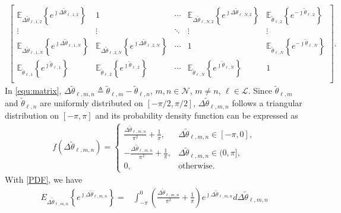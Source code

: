 \documentclass[12pt,draftclsnofoot, onecolumn]{IEEEtran}
\theoremstyle{plain}
\begin{document}
\begin{sloppypar}
\begin{align}
\begin{bmatrix}
\mathbb E_{\Delta\tilde{\theta}_{\ell,1,2}}\left\lbrace e^{\jmath\Delta\tilde{\theta}_{\ell,1,2}}\right\rbrace & 1 & \cdots & \mathbb E_{\Delta\tilde{\theta}_{\ell,N,2}}\left\lbrace e^{\jmath\Delta\tilde{\theta}_{\ell,N,2}}\right\rbrace & \mathbb E_{\tilde\theta_{\ell,2}}\left\lbrace e^{-\jmath\tilde{\theta}_{\ell,2}}\right\rbrace \\
\vdots & \vdots & \ddots & \vdots & \vdots \\
\mathbb E_{\Delta\tilde{\theta}_{\ell,1,N}}\left\lbrace e^{\jmath\Delta\tilde{\theta}_{\ell,1,N}}\right\rbrace & \mathbb E_{\Delta\tilde{\theta}_{\ell,2,N}}\left\lbrace e^{\jmath\Delta\tilde{\theta}_{\ell,2,N}}\right\rbrace & \cdots &  1 & \mathbb E_{\tilde\theta_{\ell,N}}\left\lbrace e^{-\jmath\tilde{\theta}_{\ell,N}}\right\rbrace \\
\mathbb E_{\tilde\theta_{\ell,1}}\left\lbrace e^{\jmath\tilde{\theta}_{\ell,1}}\right\rbrace  & \mathbb E_{\tilde\theta_{\ell,2}}\left\lbrace e^{\jmath\tilde{\theta}_{\ell,2}}\right\rbrace  & \cdots & \mathbb E_{\tilde\theta_{\ell,N}}\left\lbrace e^{\jmath\tilde{\theta}_{\ell,N}}\right\rbrace & 1 \\
\end{bmatrix}. 
\end{align}
In \eqref{equ:matrix}, $\Delta\tilde{\theta}_{\ell,m,n} \triangleq \tilde{\theta}_{\ell,m} - \tilde{\theta}_{\ell,n}$, $m,n\in\mathcal N$, $m\neq n$, $\ell\in\mathcal L$. Since $\tilde{\theta}_{\ell,m}$ and $\tilde{\theta}_{\ell,n}$ are uniformly distributed on $\left[-{\pi}/{2}, {\pi}/{2}\right]$, $\Delta\tilde{\theta}_{\ell,m,n}$ follows a triangular distribution on $[-\pi,\pi]$ and its probability density function can be expressed as
\begin{align}\label{PDF}
f\left(\Delta\tilde{\theta}_{\ell,m,n}\right) = \begin{cases}
\frac{\Delta\tilde{\theta}_{\ell,m,n}}{\pi^2} + \frac{1}{\pi}, & \Delta\tilde{\theta}_{\ell,m,n} \in [-\pi,0],\\
-\frac{\Delta\tilde{\theta}_{\ell,m,n}}{\pi^2} + \frac{1}{\pi}, & \Delta\tilde{\theta}_{\ell,m,n} \in (0,\pi], \\
0, & \text{otherwise}. 
\end{cases}
\end{align}
With \eqref{PDF}, we have 
\begin{align}\label{expectation_1}
E_{\Delta\tilde{\theta}_{\ell,m,n}}\left\lbrace e^{\jmath\Delta\tilde{\theta}_{\ell,m,n}}\right\rbrace = & \int_{-\pi}^{0}\left(\frac{\Delta\tilde{\theta}_{\ell,m,n}}{\pi^2} + \frac{1}{\pi} \right)e^{\jmath\Delta\tilde{\theta}_{\ell,m,n}}d\Delta\tilde{\theta}_{\ell,m,n} \nonumber\\

\end{align}
\end{sloppypar}
\end{document}
